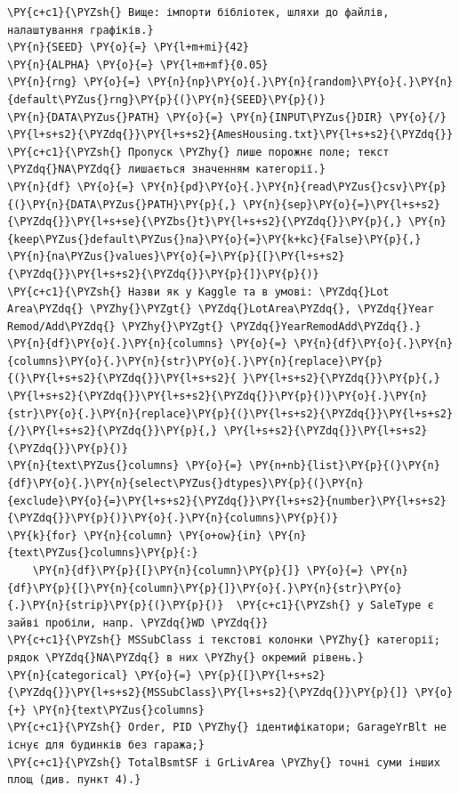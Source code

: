 \begin{Verbatim}[commandchars=\\\{\}]
\PY{c+c1}{\PYZsh{} Вище: імпорти бібліотек, шляхи до файлів, налаштування графіків.}
\PY{n}{SEED} \PY{o}{=} \PY{l+m+mi}{42}
\PY{n}{ALPHA} \PY{o}{=} \PY{l+m+mf}{0.05}
\PY{n}{rng} \PY{o}{=} \PY{n}{np}\PY{o}{.}\PY{n}{random}\PY{o}{.}\PY{n}{default\PYZus{}rng}\PY{p}{(}\PY{n}{SEED}\PY{p}{)}
\PY{n}{DATA\PYZus{}PATH} \PY{o}{=} \PY{n}{INPUT\PYZus{}DIR} \PY{o}{/} \PY{l+s+s2}{\PYZdq{}}\PY{l+s+s2}{AmesHousing.txt}\PY{l+s+s2}{\PYZdq{}}
\PY{c+c1}{\PYZsh{} Пропуск \PYZhy{} лише порожнє поле; текст \PYZdq{}NA\PYZdq{} лишається значенням категорії.}
\PY{n}{df} \PY{o}{=} \PY{n}{pd}\PY{o}{.}\PY{n}{read\PYZus{}csv}\PY{p}{(}\PY{n}{DATA\PYZus{}PATH}\PY{p}{,} \PY{n}{sep}\PY{o}{=}\PY{l+s+s2}{\PYZdq{}}\PY{l+s+se}{\PYZbs{}t}\PY{l+s+s2}{\PYZdq{}}\PY{p}{,} \PY{n}{keep\PYZus{}default\PYZus{}na}\PY{o}{=}\PY{k+kc}{False}\PY{p}{,} \PY{n}{na\PYZus{}values}\PY{o}{=}\PY{p}{[}\PY{l+s+s2}{\PYZdq{}}\PY{l+s+s2}{\PYZdq{}}\PY{p}{]}\PY{p}{)}
\PY{c+c1}{\PYZsh{} Назви як у Kaggle та в умові: \PYZdq{}Lot Area\PYZdq{} \PYZhy{}\PYZgt{} \PYZdq{}LotArea\PYZdq{}, \PYZdq{}Year Remod/Add\PYZdq{} \PYZhy{}\PYZgt{} \PYZdq{}YearRemodAdd\PYZdq{}.}
\PY{n}{df}\PY{o}{.}\PY{n}{columns} \PY{o}{=} \PY{n}{df}\PY{o}{.}\PY{n}{columns}\PY{o}{.}\PY{n}{str}\PY{o}{.}\PY{n}{replace}\PY{p}{(}\PY{l+s+s2}{\PYZdq{}}\PY{l+s+s2}{ }\PY{l+s+s2}{\PYZdq{}}\PY{p}{,} \PY{l+s+s2}{\PYZdq{}}\PY{l+s+s2}{\PYZdq{}}\PY{p}{)}\PY{o}{.}\PY{n}{str}\PY{o}{.}\PY{n}{replace}\PY{p}{(}\PY{l+s+s2}{\PYZdq{}}\PY{l+s+s2}{/}\PY{l+s+s2}{\PYZdq{}}\PY{p}{,} \PY{l+s+s2}{\PYZdq{}}\PY{l+s+s2}{\PYZdq{}}\PY{p}{)}
\PY{n}{text\PYZus{}columns} \PY{o}{=} \PY{n+nb}{list}\PY{p}{(}\PY{n}{df}\PY{o}{.}\PY{n}{select\PYZus{}dtypes}\PY{p}{(}\PY{n}{exclude}\PY{o}{=}\PY{l+s+s2}{\PYZdq{}}\PY{l+s+s2}{number}\PY{l+s+s2}{\PYZdq{}}\PY{p}{)}\PY{o}{.}\PY{n}{columns}\PY{p}{)}
\PY{k}{for} \PY{n}{column} \PY{o+ow}{in} \PY{n}{text\PYZus{}columns}\PY{p}{:}
    \PY{n}{df}\PY{p}{[}\PY{n}{column}\PY{p}{]} \PY{o}{=} \PY{n}{df}\PY{p}{[}\PY{n}{column}\PY{p}{]}\PY{o}{.}\PY{n}{str}\PY{o}{.}\PY{n}{strip}\PY{p}{(}\PY{p}{)}  \PY{c+c1}{\PYZsh{} у SaleType є зайві пробіли, напр. \PYZdq{}WD \PYZdq{}}
\PY{c+c1}{\PYZsh{} MSSubClass і текстові колонки \PYZhy{} категорії; рядок \PYZdq{}NA\PYZdq{} в них \PYZhy{} окремий рівень.}
\PY{n}{categorical} \PY{o}{=} \PY{p}{[}\PY{l+s+s2}{\PYZdq{}}\PY{l+s+s2}{MSSubClass}\PY{l+s+s2}{\PYZdq{}}\PY{p}{]} \PY{o}{+} \PY{n}{text\PYZus{}columns}
\PY{c+c1}{\PYZsh{} Order, PID \PYZhy{} ідентифікатори; GarageYrBlt не існує для будинків без гаража;}
\PY{c+c1}{\PYZsh{} TotalBsmtSF і GrLivArea \PYZhy{} точні суми інших площ (див. пункт 4).}

\end{Verbatim}
